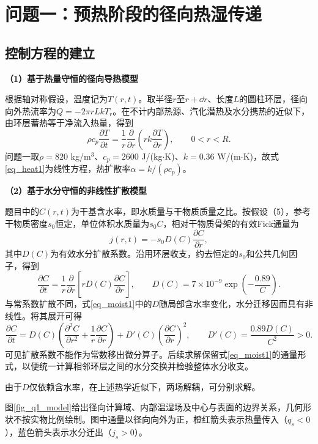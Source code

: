 \section{问题一：预热阶段的径向热湿传递}
\subsection{控制方程的建立}
\medskip
\noindent\textbf{（1）基于热量守恒的径向导热模型}

根据轴对称假设，温度记为$T(r,t)$。取半径$r$至$r+\dd r$、长度$L$的圆柱环层，径向向外热流率为$Q=-2\pi rLkT_r$。在不计内部热源、汽化潜热及水分携热的近似下，由环层蓄热等于净流入热量，得到
\begin{equation}\label{eq_heat1}
\rho c_p\frac{\partial T}{\partial t}
=\frac1r\frac{\partial}{\partial r}\left(rk\frac{\partial T}{\partial r}\right),
\qquad 0<r<R.
\end{equation}
问题一取$\rho=820$ kg/m$^3$、$c_p=2600$ J/(kg$\cdot$K)、$k=0.36$ W/(m$\cdot$K)，故式\eqref{eq_heat1}为线性方程，热扩散率$\alpha=k/(\rho c_p)$。

\medskip
\noindent\textbf{（2）基于水分守恒的非线性扩散模型}

题目中的$C(r,t)$为干基含水率，即水质量与干物质质量之比。按假设（5），参考干物质密度$s_0$恒定，单位体积水质量为$s_0C$，相对干物质骨架的有效Fick通量为
\[
j(r,t)=-s_0D(C)\frac{\partial C}{\partial r},
\]
其中$D(C)$为有效水分扩散系数。沿用环层收支，约去恒定的$s_0$和公共几何因子，得到
\begin{equation}\label{eq_moist1}
\frac{\partial C}{\partial t}
=\frac1r\frac{\partial}{\partial r}\!\left[rD(C)\frac{\partial C}{\partial r}\right],\qquad
D(C)=7\times10^{-9}\exp\!\left(-\frac{0.89}{C}\right).
\end{equation}
与常系数扩散不同，式\eqref{eq_moist1}中的$D$随局部含水率变化，水分迁移因而具有非线性。将其展开可得
\[
\frac{\partial C}{\partial t}
=D(C)\left(\frac{\partial^2C}{\partial r^2}+\frac1r\frac{\partial C}{\partial r}\right)
+D'(C)\left(\frac{\partial C}{\partial r}\right)^2,
\qquad D'(C)=\frac{0.89D(C)}{C^2}>0.
\]
可见扩散系数不能作为常数移出微分算子。后续求解保留式\eqref{eq_moist1}的通量形式，以便统一计算相邻环层之间的水分交换并检验整体水分收支。

由于$D$仅依赖含水率，在上述热学近似下，两场解耦，可分别求解。

图\ref{fig_q1_model}给出径向计算域、内部温湿场及中心与表面的边界关系，几何形状不按实物比例绘制。图中通量以径向向外为正，橙红箭头表示热量传入（$q_s<0$），蓝色箭头表示水分迁出（$j_s>0$）。
\FloatBarrier

